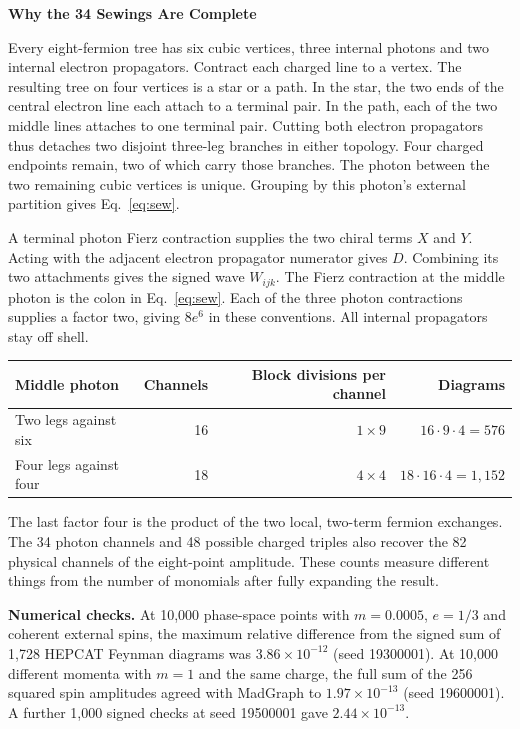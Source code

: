 \documentclass[11pt]{article}
\begin{document}
\newpage
{\Large\bfseries Why the 34 Sewings Are Complete}

Every eight-fermion tree has six cubic vertices, three internal photons and
two internal electron propagators. Contract each charged line to a vertex.
The resulting tree on four vertices is a star or a path. In the star, the
two ends of the central electron line each attach to a terminal pair.
In the path, each of the two middle lines attaches to one terminal pair.
Cutting both electron propagators thus detaches two disjoint three-leg
branches in either topology. Four charged endpoints remain, two of which
carry those branches. The photon between the two remaining cubic vertices is
unique. Grouping by this photon's external partition gives Eq.~\eqref{eq:sew}.

A terminal photon Fierz contraction supplies the two chiral terms $X$ and
$Y$. Acting with the adjacent electron propagator numerator gives $D$. Combining
its two attachments gives the signed wave $W_{ijk}$. The Fierz contraction at
the middle photon is the colon in Eq.~\eqref{eq:sew}. Each of the three photon
contractions supplies a factor two, giving $8e^6$ in these conventions.
All internal propagators stay off shell.

\begin{center}
\begin{tabular}{@{}lrrr@{}}
\toprule
Middle photon & Channels & Block divisions per channel & Diagrams \\
\midrule
Two legs against six  & 16 & $1\times9$ & $16\cdot9\cdot4=576$ \\
Four legs against four & 18 & $4\times4$ & $18\cdot16\cdot4=1,152$ \\
\bottomrule
\end{tabular}
\end{center}
The last factor four is the product of the two local, two-term fermion exchanges.
The 34 photon channels and 48 possible charged triples also recover the
82 physical channels of the eight-point amplitude. These counts measure
different things from the number of monomials after fully expanding the result.

\textbf{Numerical checks.} At 10,000 phase-space points with $m=0.0005$,
$e=1/3$ and coherent external spins, the maximum relative difference from
the signed sum of 1,728 HEPCAT Feynman diagrams was $3.86\times10^{-12}$
(seed 19300001). At 10,000 different momenta with $m=1$ and the same charge,
the full sum of the 256 squared spin amplitudes agreed with MadGraph to
$1.97\times10^{-13}$ (seed 19600001). A further 1,000 signed checks at
seed 19500001 gave $2.44\times10^{-13}$.
\end{document}
